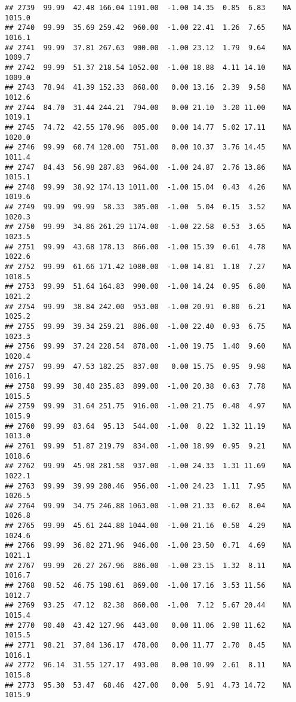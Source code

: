 \documentclass{article}\usepackage{graphicx, color}
\makeatletter
\newenvironment{kframe}{%
 \def\at@end@of@kframe{}%
 \ifinner\ifhmode%
  \def\at@end@of@kframe{\end{minipage}}%
  \begin{minipage}{\columnwidth}%
 \fi\fi%
 \def\FrameCommand##1{\hskip\@totalleftmargin \hskip-\fboxsep
 \colorbox{shadecolor}{##1}\hskip-\fboxsep
     \hskip-\linewidth \hskip-\@totalleftmargin \hskip\columnwidth}%
 \MakeFramed {\advance\hsize-\width
   \@totalleftmargin\z@ \linewidth\hsize
   \@setminipage}}%
 {\par\unskip\endMakeFramed%
 \at@end@of@kframe}
\newenvironment{knitrout}{}{} %
\makeatother
\begin{document}
\begin{knitrout}
\begin{kframe}
\begin{verbatim}
## 2739  99.99  42.48 166.04 1191.00  -1.00 14.35  0.85  6.83    NA 1015.0
## 2740  99.99  35.69 259.42  960.00  -1.00 22.41  1.26  7.65    NA 1016.1
## 2741  99.99  37.81 267.63  900.00  -1.00 23.12  1.79  9.64    NA 1009.7
## 2742  99.99  51.37 218.54 1052.00  -1.00 18.88  4.11 14.10    NA 1009.0
## 2743  78.94  41.39 152.33  868.00   0.00 13.16  2.39  9.58    NA 1012.6
## 2744  84.70  31.44 244.21  794.00   0.00 21.10  3.20 11.00    NA 1019.1
## 2745  74.72  42.55 170.96  805.00   0.00 14.77  5.02 17.11    NA 1020.0
## 2746  99.99  60.74 120.00  751.00   0.00 10.37  3.76 14.45    NA 1011.4
## 2747  84.43  56.98 287.83  964.00  -1.00 24.87  2.76 13.86    NA 1015.1
## 2748  99.99  38.92 174.13 1011.00  -1.00 15.04  0.43  4.26    NA 1019.6
## 2749  99.99  99.99  58.33  305.00  -1.00  5.04  0.15  3.52    NA 1020.3
## 2750  99.99  34.86 261.29 1174.00  -1.00 22.58  0.53  3.65    NA 1023.5
## 2751  99.99  43.68 178.13  866.00  -1.00 15.39  0.61  4.78    NA 1022.6
## 2752  99.99  61.66 171.42 1080.00  -1.00 14.81  1.18  7.27    NA 1018.5
## 2753  99.99  51.64 164.83  990.00  -1.00 14.24  0.95  6.80    NA 1021.2
## 2754  99.99  38.84 242.00  953.00  -1.00 20.91  0.80  6.21    NA 1025.2
## 2755  99.99  39.34 259.21  886.00  -1.00 22.40  0.93  6.75    NA 1023.3
## 2756  99.99  37.24 228.54  878.00  -1.00 19.75  1.40  9.60    NA 1020.4
## 2757  99.99  47.53 182.25  837.00   0.00 15.75  0.95  9.98    NA 1016.1
## 2758  99.99  38.40 235.83  899.00  -1.00 20.38  0.63  7.78    NA 1015.5
## 2759  99.99  31.64 251.75  916.00  -1.00 21.75  0.48  4.97    NA 1015.9
## 2760  99.99  83.64  95.13  544.00  -1.00  8.22  1.32 11.19    NA 1013.0
## 2761  99.99  51.87 219.79  834.00  -1.00 18.99  0.95  9.21    NA 1018.6
## 2762  99.99  45.98 281.58  937.00  -1.00 24.33  1.31 11.69    NA 1022.1
## 2763  99.99  39.99 280.46  956.00  -1.00 24.23  1.11  7.95    NA 1026.5
## 2764  99.99  34.75 246.88 1063.00  -1.00 21.33  0.62  8.04    NA 1026.8
## 2765  99.99  45.61 244.88 1044.00  -1.00 21.16  0.58  4.29    NA 1024.6
## 2766  99.99  36.82 271.96  946.00  -1.00 23.50  0.71  4.69    NA 1021.1
## 2767  99.99  26.27 267.96  886.00  -1.00 23.15  1.32  8.11    NA 1016.7
## 2768  98.52  46.75 198.61  869.00  -1.00 17.16  3.53 11.56    NA 1012.7
## 2769  93.25  47.12  82.38  860.00  -1.00  7.12  5.67 20.44    NA 1015.4
## 2770  90.40  43.42 127.96  443.00   0.00 11.06  2.98 11.62    NA 1015.5
## 2771  98.21  37.84 136.17  478.00   0.00 11.77  2.70  8.45    NA 1016.1
## 2772  96.14  31.55 127.17  493.00   0.00 10.99  2.61  8.11    NA 1015.8
## 2773  95.30  53.47  68.46  427.00   0.00  5.91  4.73 14.72    NA 1015.9

\end{verbatim}
\end{kframe}
\end{knitrout}
\end{document}
